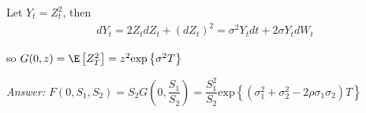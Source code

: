 \noindent Let $Y_t = Z_t^2$, then 
\begin{equation*}
  \begin{gathered}
    dY_t = 2Z_tdZ_t+(dZ_t)^2=\sigma^2Y_tdt+2\sigma Y_tdW_t
  \end{gathered}
\end{equation*}\par
\noindent so $G(0,z) = \E\left[Z_T^2\right] = z^2\text{exp}\left\{\sigma^2T\right\}$
\par\bigskip
\noindent\textit{Answer:} $F(0,S_1,S_2) = S_2G\left(0,\dfrac{S_1}{S_2}\right) = \dfrac{S_1^2}{S_2}\text{exp}\left\{\left(\sigma_1^2+\sigma_2^2-2\rho\sigma_1\sigma_2\right)T\right\}$

